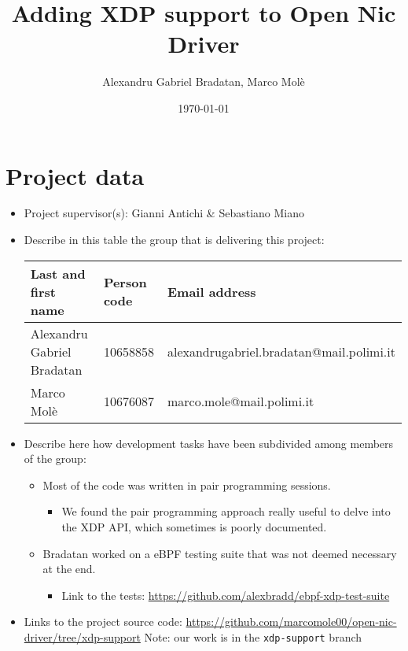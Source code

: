 \documentclass[10pt,a4]{article}
\author{Alexandru Gabriel Bradatan, Marco Molè}
\date{\today}
\title{Adding XDP support to Open Nic Driver}
\begin{document}
\maketitle
\tableofcontents



\section{Project data}

\begin{itemize}
\item Project supervisor(s): Gianni Antichi \& Sebastiano Miano
\item Describe in this table the group that is delivering this project:

\begin{center}
\begin{tabular}{lll}
Last and first name & Person code & Email address\\
\hline
  Alexandru Gabriel Bradatan & 10658858 & alexandrugabriel.bradatan@mail.polimi.it \\
  Marco Molè & 10676087  &     marco.mole@mail.polimi.it
\end{tabular}
\end{center}

\item
Describe here how development tasks have been subdivided among members
of the group:

\begin{itemize}
\item Most of the code was written in pair programming sessions.
\begin{itemize}
	\item We found the pair programming approach really useful to delve into the XDP API, which sometimes is poorly documented.
\end{itemize}
\item Bradatan worked on a eBPF testing suite that was not deemed necessary at the end.
\begin{itemize}
  \item Link to the tests: \url{https://github.com/alexbradd/ebpf-xdp-test-suite}
\end{itemize}
\end{itemize}

\item Links to the project source code: \url{https://github.com/marcomole00/open-nic-driver/tree/xdp-support}
Note: our work is in the \texttt{xdp-support} branch

\end{itemize}
\end{document}
